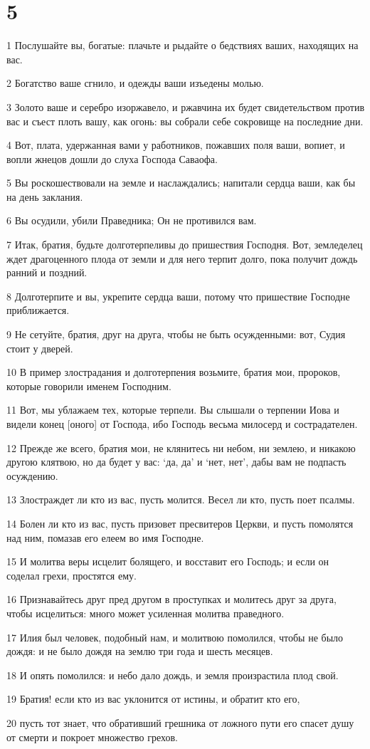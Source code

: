 \chapter{5}

\par 1 Послушайте вы, богатые: плачьте и рыдайте о бедствиях ваших, находящих на вас.
\par 2 Богатство ваше сгнило, и одежды ваши изъедены молью.
\par 3 Золото ваше и серебро изоржавело, и ржавчина их будет свидетельством против вас и съест плоть вашу, как огонь: вы собрали себе сокровище на последние дни.
\par 4 Вот, плата, удержанная вами у работников, пожавших поля ваши, вопиет, и вопли жнецов дошли до слуха Господа Саваофа.
\par 5 Вы роскошествовали на земле и наслаждались; напитали сердца ваши, как бы на день заклания.
\par 6 Вы осудили, убили Праведника; Он не противился вам.
\par 7 Итак, братия, будьте долготерпеливы до пришествия Господня. Вот, земледелец ждет драгоценного плода от земли и для него терпит долго, пока получит дождь ранний и поздний.
\par 8 Долготерпите и вы, укрепите сердца ваши, потому что пришествие Господне приближается.
\par 9 Не сетуйте, братия, друг на друга, чтобы не быть осужденными: вот, Судия стоит у дверей.
\par 10 В пример злострадания и долготерпения возьмите, братия мои, пророков, которые говорили именем Господним.
\par 11 Вот, мы ублажаем тех, которые терпели. Вы слышали о терпении Иова и видели конец [оного] от Господа, ибо Господь весьма милосерд и сострадателен.
\par 12 Прежде же всего, братия мои, не клянитесь ни небом, ни землею, и никакою другою клятвою, но да будет у вас: `да, да' и `нет, нет', дабы вам не подпасть осуждению.
\par 13 Злостраждет ли кто из вас, пусть молится. Весел ли кто, пусть поет псалмы.
\par 14 Болен ли кто из вас, пусть призовет пресвитеров Церкви, и пусть помолятся над ним, помазав его елеем во имя Господне.
\par 15 И молитва веры исцелит болящего, и восставит его Господь; и если он соделал грехи, простятся ему.
\par 16 Признавайтесь друг пред другом в проступках и молитесь друг за друга, чтобы исцелиться: много может усиленная молитва праведного.
\par 17 Илия был человек, подобный нам, и молитвою помолился, чтобы не было дождя: и не было дождя на землю три года и шесть месяцев.
\par 18 И опять помолился: и небо дало дождь, и земля произрастила плод свой.
\par 19 Братия! если кто из вас уклонится от истины, и обратит кто его,
\par 20 пусть тот знает, что обративший грешника от ложного пути его спасет душу от смерти и покроет множество грехов.


